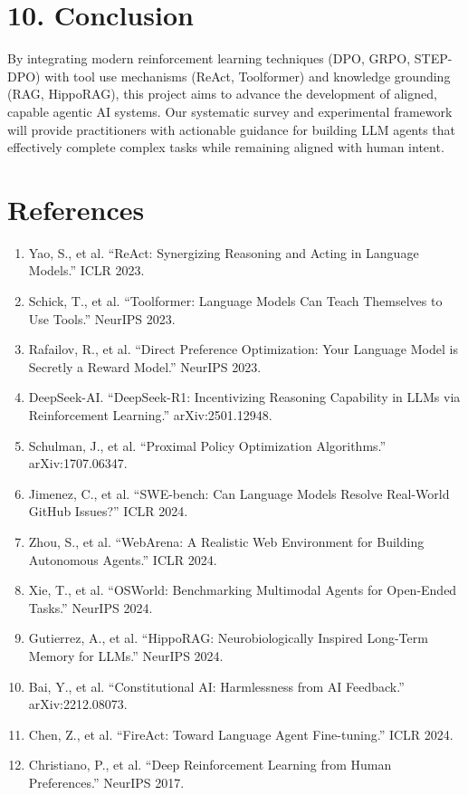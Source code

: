 \documentclass[12pt,a4paper]{report}
\theoremstyle{definition}
\begin{document}
\section*{10. Conclusion}

By integrating modern reinforcement learning techniques (DPO, GRPO, STEP-DPO) with tool use mechanisms (ReAct, Toolformer) and knowledge grounding (RAG, HippoRAG), this project aims to advance the development of aligned, capable agentic AI systems. Our systematic survey and experimental framework will provide practitioners with actionable guidance for building LLM agents that effectively complete complex tasks while remaining aligned with human intent.

\section*{References}

\begin{enumerate}
    \item Yao, S., et al. ``ReAct: Synergizing Reasoning and Acting in Language Models.'' ICLR 2023.
    \item Schick, T., et al. ``Toolformer: Language Models Can Teach Themselves to Use Tools.'' NeurIPS 2023.
    \item Rafailov, R., et al. ``Direct Preference Optimization: Your Language Model is Secretly a Reward Model.'' NeurIPS 2023.
    \item DeepSeek-AI. ``DeepSeek-R1: Incentivizing Reasoning Capability in LLMs via Reinforcement Learning.'' arXiv:2501.12948.
    \item Schulman, J., et al. ``Proximal Policy Optimization Algorithms.'' arXiv:1707.06347.
    \item Jimenez, C., et al. ``SWE-bench: Can Language Models Resolve Real-World GitHub Issues?'' ICLR 2024.
    \item Zhou, S., et al. ``WebArena: A Realistic Web Environment for Building Autonomous Agents.'' ICLR 2024.
    \item Xie, T., et al. ``OSWorld: Benchmarking Multimodal Agents for Open-Ended Tasks.'' NeurIPS 2024.
    \item Gutierrez, A., et al. ``HippoRAG: Neurobiologically Inspired Long-Term Memory for LLMs.'' NeurIPS 2024.
    \item Bai, Y., et al. ``Constitutional AI: Harmlessness from AI Feedback.'' arXiv:2212.08073.
    \item Chen, Z., et al. ``FireAct: Toward Language Agent Fine-tuning.'' ICLR 2024.
    \item Christiano, P., et al. ``Deep Reinforcement Learning from Human Preferences.'' NeurIPS 2017.
\end{enumerate}
\end{document}
